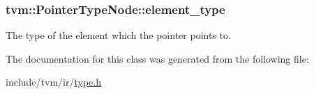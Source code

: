\subsubsection[{\texorpdfstring{element\+\_\+type}{element_type}}]{ tvm\+::\+Pointer\+Type\+Node\+::element\+\_\+type}\hypertarget{classtvm_1_1PointerTypeNode_a3ce20495711da0c9f83f02df466ae8a0}{}\label{classtvm_1_1PointerTypeNode_a3ce20495711da0c9f83f02df466ae8a0}


The type of the element which the pointer points to. 



The documentation for this class was generated from the following file\+:\begin{DoxyCompactItemize}
\item 
include/tvm/ir/\hyperlink{ir_2type_8h}{type.\+h}\end{DoxyCompactItemize}

